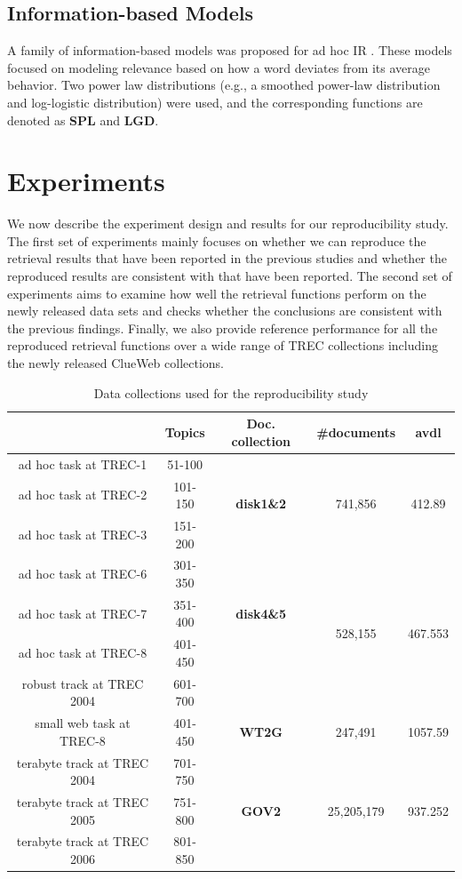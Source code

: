 \subsection{Information-based Models}

A family of information-based models was proposed 
for ad hoc IR \cite{Clinchant:2010:IMA:1835449.1835490}.
These models focused on modeling relevance based on how 
a word deviates from its average behavior. Two power
law distributions (e.g., a smoothed power-law distribution and
log-logistic distribution) were used, and the corresponding 
functions are denoted as \textbf{SPL} and \textbf{LGD}. 


\section{Experiments}
\label{sec:rep_res}

We now describe the experiment design and results for our reproducibility 
study.  The first set of experiments mainly focuses on whether we can 
reproduce the retrieval results that have been reported in the previous 
studies and whether the reproduced results are consistent with that 
have been reported.  The second set of experiments aims to examine how 
well the retrieval functions perform on the newly released data sets
and checks whether the conclusions are consistent with the previous findings. 
Finally, we also provide reference performance for all the reproduced retrieval functions 
over a wide range of TREC collections including the newly released ClueWeb 
collections. 


\begin{table}[t]
\centering
\small
\caption{Data collections used for the reproducibility study}
\label{tab:data1}
\begin{tabular}{ |c|c|c|c|c| } \hline
  &  Topics & Doc. collection & \#documents & avdl \\ \hline 
ad hoc task at TREC-1 & 51-100 & \multirow{3}{*}{\textbf{disk1\&2}} & \multirow{3}{*}{741,856} & \multirow{3}{*}{412.89} \\ 
ad hoc task at TREC-2 & 101-150 & & & \\ 
ad hoc task at TREC-3 & 151-200 & & & \\ \hline
ad hoc task at TREC-6 & 301-350 & \multirow{3}{*}{\textbf{disk4\&5}} & \multirow{4}{*}{528,155} & \multirow{4}{*}{467.553} \\
ad hoc task at TREC-7 & 351-400 & & &\\ 
ad hoc task at TREC-8 & 401-450 & & &\\ 
robust track at TREC 2004 & 601-700 & & & \\ \hline
small web task at TREC-8 & 401-450 & \textbf{WT2G} & 247,491 & 1057.59 \\ \hline
terabyte track at TREC 2004 & 701-750 & \multirow{3}{*}{\textbf{GOV2}} & \multirow{3}{*}{25,205,179} & \multirow{3}{*}{937.252} \\ 
terabyte track at TREC 2005 & 751-800 &  & &  \\ 
terabyte track at TREC 2006  & 801-850 &  & &  \\ \hline
\end{tabular}
\end{table}


